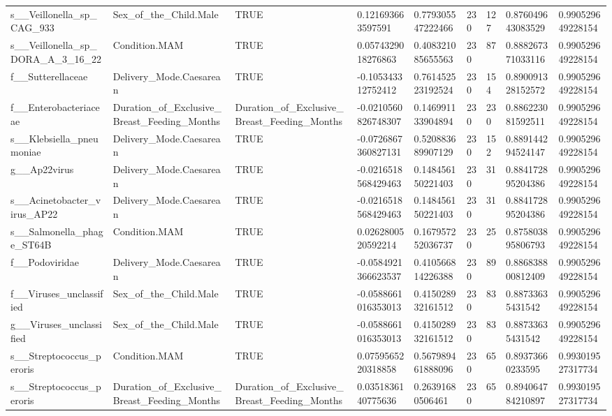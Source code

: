 \begin{longtable}{lllllllll}
s\_\_Veillonella\_sp\_CAG\_933 & Sex\_of\_the\_Child.Male & TRUE & 0.121693663597591 & 0.779305547222466 & 230 & 127 & 0.876049643083529 & 0.990529649228154 \\
s\_\_Veillonella\_sp\_DORA\_A\_3\_16\_22 & Condition.MAM & TRUE & 0.0574329018276863 & 0.408321085655563 & 230 & 87 & 0.888267371033116 & 0.990529649228154 \\
f\_\_Sutterellaceae & Delivery\_Mode.Caesarean & TRUE & -0.105343312752412 & 0.761452523192524 & 230 & 154 & 0.890091328152572 & 0.990529649228154 \\
f\_\_Enterobacteriaceae & Duration\_of\_Exclusive\_Breast\_Feeding\_Months & Duration\_of\_Exclusive\_Breast\_Feeding\_Months & -0.0210560826748307 & 0.146991133904894 & 230 & 230 & 0.886223081592511 & 0.990529649228154 \\
s\_\_Klebsiella\_pneumoniae & Delivery\_Mode.Caesarean & TRUE & -0.0726867360827131 & 0.520883689907129 & 230 & 152 & 0.889144294524147 & 0.990529649228154 \\
g\_\_Ap22virus & Delivery\_Mode.Caesarean & TRUE & -0.0216518568429463 & 0.148456150221403 & 230 & 31 & 0.884172895204386 & 0.990529649228154 \\
s\_\_Acinetobacter\_virus\_AP22 & Delivery\_Mode.Caesarean & TRUE & -0.0216518568429463 & 0.148456150221403 & 230 & 31 & 0.884172895204386 & 0.990529649228154 \\
s\_\_Salmonella\_phage\_ST64B & Condition.MAM & TRUE & 0.0262800520592214 & 0.167957252036737 & 230 & 25 & 0.875803895806793 & 0.990529649228154 \\
f\_\_Podoviridae & Delivery\_Mode.Caesarean & TRUE & -0.0584921366623537 & 0.410566814226388 & 230 & 89 & 0.886838800812409 & 0.990529649228154 \\
f\_\_Viruses\_unclassified & Sex\_of\_the\_Child.Male & TRUE & -0.0588661016353013 & 0.415028932161512 & 230 & 83 & 0.88733635431542 & 0.990529649228154 \\
g\_\_Viruses\_unclassified & Sex\_of\_the\_Child.Male & TRUE & -0.0588661016353013 & 0.415028932161512 & 230 & 83 & 0.88733635431542 & 0.990529649228154 \\
s\_\_Streptococcus\_peroris & Condition.MAM & TRUE & 0.0759565220318858 & 0.567989461888096 & 230 & 65 & 0.89373660233595 & 0.993019527317734 \\
s\_\_Streptococcus\_peroris & Duration\_of\_Exclusive\_Breast\_Feeding\_Months & Duration\_of\_Exclusive\_Breast\_Feeding\_Months & 0.0351836140775636 & 0.26391680506461 & 230 & 65 & 0.894064784210897 & 0.993019527317734 \\

\end{longtable}

